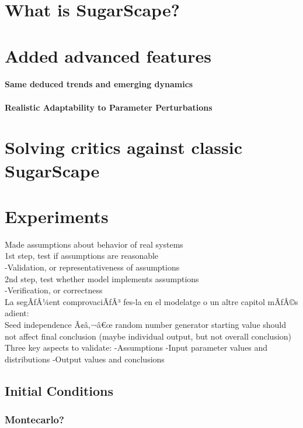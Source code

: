 \documentclass{report}
\begin{document}
\begin{enumeration}
\begin{end}
	\section{What is SugarScape?}
	\section{Added advanced features}
		\paragraph{Same deduced trends and emerging dynamics}
		\paragraph{Realistic Adaptability to Parameter Perturbations}
	\section{Solving critics against classic SugarScape}
	\section{Experiments}

Made assumptions about behavior of real systems\\
  1st step, test if assumptions are reasonable\\
    -Validation, or representativeness of assumptions\\
  2nd step, test whether model implements assumptions\\
    -Verification, or correctness\\

La segÃƒÂ¼ent comprovaciÃƒÂ³ fes-la en el modelatge o un altre capitol mÃƒÂ©s adient:\\
Seed independence Ã¢â‚¬â€œ random number generator starting value should not affect final conclusion (maybe individual output, but not overall conclusion)
Three key aspects to validate:
  -Assumptions
  -Input parameter values and distributions
  -Output values and conclusions





		\subsection{Initial Conditions}
			\subsubsection{Montecarlo?} 

\end{end}
\end{enumeration}
\end{document}
